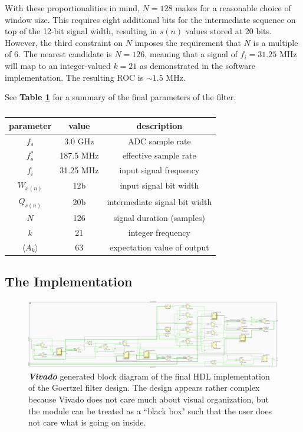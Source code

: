 \documentclass[reprint,amsmath,amssymb,aps,pra]{revtex4-2}
\begin{document}
With these proportionalities in mind, $N = 128$ makes for a reasonable choice of window size. This requires eight additional bits for the intermediate sequence on top of the 12-bit signal width, resulting in $s(n)$ values stored at 20 bits. However, the third constraint on $N$ imposes the requirement that $N$ is a multiple of 6. The nearest candidate is $N = 126$, meaning that a signal of $f_i = 31.25$ MHz will map to an integer-valued $k = 21$ as demonstrated in the software implementation. The resulting ROC is $\sim 1.5$ MHz.

See \textbf{Table \ref{table:params}} for a summary of the final parameters of the filter.

\begin{table}
    \centering
    \begin{tabular}{| c | c | c |}
    \hline
        parameter & value & description \\
    \hline
        $f_s$ & 3.0 GHz & ADC sample rate\\
        $f_s^*$ & 187.5 MHz & effective sample rate \\
        $f_i$ & 31.25 MHz & input signal frequency \\
    \hline
        $W_{x(n)}$ & 12b & input signal bit width \\
        $Q_{s(n)}$ & 20b & intermediate signal bit width \\
    \hline
        $N$ & 126 & signal duration (samples)\\
        $k$ & 21 & integer frequency \\
        $\langle A_k\rangle$ & 63 & expectation value of output \\
    \hline
    \end{tabular}
    \caption{}
    \label{table:params}
\end{table}

\subsection{The Implementation}

\begin{figure}
    \centering
    \includegraphics[width=\linewidth]{figs/bd_goertzel.png}
    \caption{\textit{\textbf{Vivado}} generated block diagram of the final HDL implementation of the Goertzel filter design. The design appears rather complex because Vivado does not care much about visual organization, but the module can be treated as a ``black box" such that the user does not care what is going on inside.}
    \label{fig:blockdiag1}
\end{figure}
\end{document}
